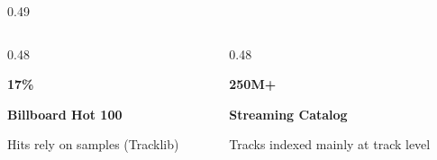 \begin{frame}[t]
\begin{columns}[onlytextwidth, c]
\begin{column}{0.49\textwidth}
      \begin{columns}[onlytextwidth, T]
        \begin{column}{0.48\textwidth}
          \begin{tcolorbox}[innercard, top=6pt, bottom=6pt]
            \centering
            {\LARGE\bfseries\textcolor{accentemerald}{17\%}}\par\vspace{0.8mm}
            {\scriptsize\bfseries\textcolor{textwhite}{Billboard Hot 100}}\par\vspace{0.4mm}
            {\tiny\textcolor{textdim}{Hits rely on samples (Tracklib)}}
          \end{tcolorbox}
        \end{column}
        \begin{column}{0.48\textwidth}
          \begin{tcolorbox}[innercard, top=6pt, bottom=6pt]
            \centering
            {\LARGE\bfseries\textcolor{accentemerald}{250M+}}\par\vspace{0.8mm}
            {\scriptsize\bfseries\textcolor{textwhite}{Streaming Catalog}}\par\vspace{0.4mm}
            {\tiny\textcolor{textdim}{Tracks indexed mainly at track level}}
          \end{tcolorbox}
        \end{column}
      \end{columns}
    \end{column}
  \end{columns}
\end{frame}

